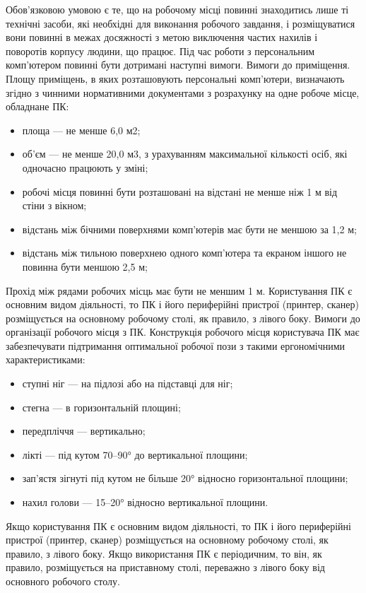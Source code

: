 \documentclass[12pt,a4paper]{article}
\begin{document}
Обов’язковою умовою є те, що на робочому місці повинні знаходитись лише ті технічні засоби, які необхідні для виконання робочого завдання, і розміщуватися вони повинні в межах досяжності з метою виключення частих нахилів і поворотів корпусу людини, що працює.
Під час роботи з персональним комп’ютером повинні бути дотримані наступні вимоги.
Вимоги до приміщення. Площу приміщень, в яких розташовують персональні комп’ютери, визначають згідно з чинними нормативними документами з розрахунку на одне робоче місце, обладнане ПК:
\begin{itemize}
\item площа — не менше 6,0 м2;
\item об’єм — не менше 20,0 м3, з урахуванням максимальної кількості осіб, які одночасно працюють у зміні;
\item робочі місця повинні бути розташовані на відстані не менше ніж 1 м від стіни з вікном;
\item відстань між бічними поверхнями комп’ютерів має бути не меншою за 1,2 м;
\item відстань між тильною поверхнею одного комп’ютера та екраном іншого не повинна бути меншою 2,5 м;
\end{itemize}
Прохід між рядами робочих місць має бути не меншим 1 м.
Користування ПК є основним видом діяльності, то ПК і його периферійні пристрої (принтер, сканер) розміщується на основному робочому столі, як правило, з лівого боку.
Вимоги до організації робочого місця з ПК. Конструкція робочого місця користувача ПК має забезпечувати підтримання оптимальної робочої пози з такими ергономічними характеристиками: 
\begin{itemize}
\item ступні ніг — на підлозі або на підставці для ніг; 
\item стегна — в горизонтальній площині; 
\item передпліччя — вертикально; 
\item лікті — під кутом 70–90° до вертикальної площини; 
\item зап’ястя зігнуті під кутом не більше 20° відносно горизонтальної площини; 
\item нахил голови — 15–20° відносно вертикальної площини.
\end{itemize}
Якщо користування ПК є основним видом діяльності, то ПК і його периферійні пристрої (принтер, сканер) розміщується на основному робочому столі, як правило, з лівого боку. Якщо використання ПК є періодичним, то він, як правило, розміщується на приставному столі, переважно з лівого боку від основного робочого столу.
\end{document}
